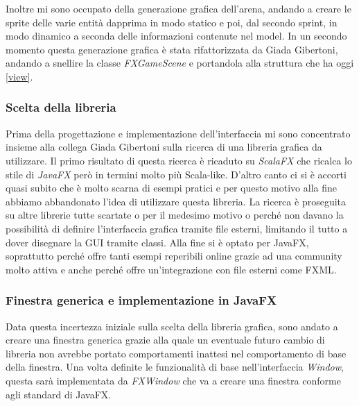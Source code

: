 Inoltre mi sono occupato della generazione grafica dell'arena, andando a creare le sprite delle varie entità dapprima in modo statico e poi, dal secondo sprint, in modo dinamico a seconda delle informazioni contenute nel model.
In un secondo momento questa generazione grafica è stata rifattorizzata da Giada Gibertoni, andando a snellire la classe \textit{FXGameScene} e portandola alla struttura che ha oggi \ref{view}.

\subsubsection{Scelta della libreria}

Prima della progettazione e implementazione dell'interfaccia mi sono concentrato insieme alla collega Giada Gibertoni sulla ricerca di una libreria grafica da utilizzare.
Il primo risultato di questa ricerca è ricaduto su \textit{ScalaFX} che ricalca lo stile di \textit{JavaFX} però in termini molto più Scala-like.
D'altro canto ci si è accorti quasi subito che è molto scarna di esempi pratici e per questo motivo alla fine abbiamo abbandonato l'idea di utilizzare questa libreria.
La ricerca è proseguita su altre librerie tutte scartate o per il medesimo motivo o perché non davano la possibilità di definire l'interfaccia grafica tramite file esterni, limitando il tutto a dover disegnare la GUI tramite classi.
Alla fine si è optato per JavaFX, soprattutto perché offre tanti esempi reperibili online grazie ad una community molto attiva e anche perché offre un'integrazione con file esterni come FXML.

\subsubsection{Finestra generica e implementazione in JavaFX}

Data questa incertezza iniziale sulla scelta della libreria grafica, sono andato a creare una finestra generica grazie alla quale un eventuale futuro cambio di libreria non avrebbe portato comportamenti inattesi nel comportamento di base della finestra.
Una volta definite le funzionalità di base nell'interfaccia \textit{Window}, questa sarà implementata da \textit{FXWindow} che va a creare una finestra conforme agli standard di JavaFX.

